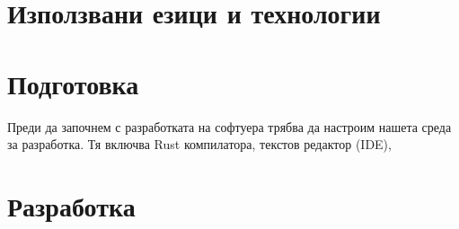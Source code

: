 \section{Използвани езици и технологии}



%
%

\newpage




\newpage

\section{Подготовка}
Преди да започнем с разработката на софтуера трябва да настроим нашета среда за разработка. Тя включва Rust компилатора, текстов редактор (IDE), 


\newpage



\newpage

\section{Разработка}
